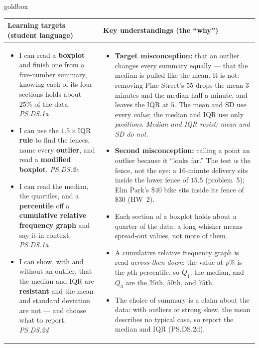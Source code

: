 \documentclass[10pt]{article}
\begin{document}
\renewcommand{\arraystretch}{1.4}
\boxguard
\begin{skillbox}{goldbox}
\begin{tabularx}{\linewidth}{@{}X|X@{}}
\textbf{Learning targets (student language)} & \textbf{Key understandings (the ``why'')} \\[2pt]
\hline
\vspace{-6pt}
\begin{itemize}[leftmargin=1.1em, nosep, after=\vspace{2pt}]
  \item I can read a \textbf{boxplot} and finish one from a five-number summary, knowing each
        of its four sections holds about $25\%$ of the data. \hfill \textit{PS.DS.1a}
  \item I can use the \textbf{$1.5 \times \text{IQR}$ rule} to find the fences, name every
        \textbf{outlier}, and read a \textbf{modified boxplot}. \hfill \textit{PS.DS.2c}
  \item I can read the median, the quartiles, and a \textbf{percentile} off a
        \textbf{cumulative relative frequency graph} and say it in context.
        \hfill \textit{PS.DS.1a}
  \item I can show, with and without an outlier, that the median and IQR are
        \textbf{resistant} and the mean and standard deviation are not --- and choose what to
        report. \hfill \textit{PS.DS.2d}
\end{itemize}
&
\vspace{-6pt}
\begin{itemize}[leftmargin=1.1em, nosep, after=\vspace{2pt}]
  \item \textbf{Target misconception:} that an outlier changes every summary equally --- that
        the median is pulled like the mean. It is not: removing Pine Street's $55$ drops the
        mean $3$ minutes and the median half a minute, and leaves the IQR at $5$. The mean and
        SD use every \emph{value}; the median and IQR use only \emph{positions}.
        \emph{Median and IQR resist; mean and SD do not.}
  \item \textbf{Second misconception:} calling a point an outlier because it ``looks far.''
        The test is the fence, not the eye: a $16$-minute delivery sits inside the lower fence
        of $15.5$ (problem~5); Elm Park's \$40 bike sits inside its fence of \$30 (HW~2).
  \item Each section of a boxplot holds about a quarter of the data; a long whisker means
        spread-out values, not more of them.
  \item A cumulative relative frequency graph is read \emph{across then down}: the value at
        $p\%$ is the $p$th percentile, so $Q_1$, the median, and $Q_3$ are the $25$th, $50$th,
        and $75$th.
  \item The choice of summary is a claim about the data: with outliers or strong skew, the
        mean describes no typical case, so report the median and IQR (PS.DS.2d).
\end{itemize}
\end{tabularx}
\end{skillbox}
\end{document}
